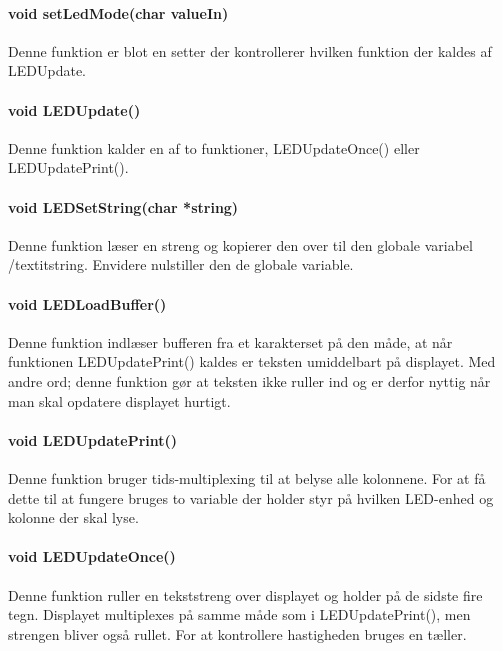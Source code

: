 \paragraph{void setLedMode(char valueIn)}
Denne funktion er blot en setter der kontrollerer hvilken funktion der kaldes af LEDUpdate.

\paragraph{void LEDUpdate()}
Denne funktion kalder en af to funktioner, LEDUpdateOnce() eller LEDUpdatePrint().

\paragraph{void LEDSetString(char *string)}
Denne funktion læser en streng  og kopierer den over til den globale variabel /textit{string}. Envidere nulstiller den de globale variable.

\paragraph{void LEDLoadBuffer()}
Denne funktion indlæser bufferen fra et karakterset på den måde, at når funktionen LEDUpdatePrint() kaldes er teksten umiddelbart på displayet. Med andre ord; denne funktion gør at teksten ikke ruller ind og er derfor nyttig når man skal opdatere displayet hurtigt.

\paragraph{void LEDUpdatePrint()}
Denne funktion bruger tids-multiplexing til at belyse alle kolonnene. For at få dette til at fungere bruges to variable der holder styr på hvilken LED-enhed og kolonne der skal lyse.

\paragraph{void LEDUpdateOnce()}
Denne funktion ruller en tekststreng over displayet og holder på de sidste fire tegn. Displayet multiplexes på samme måde som i LEDUpdatePrint(), men strengen bliver også rullet. For at kontrollere hastigheden bruges en tæller.



